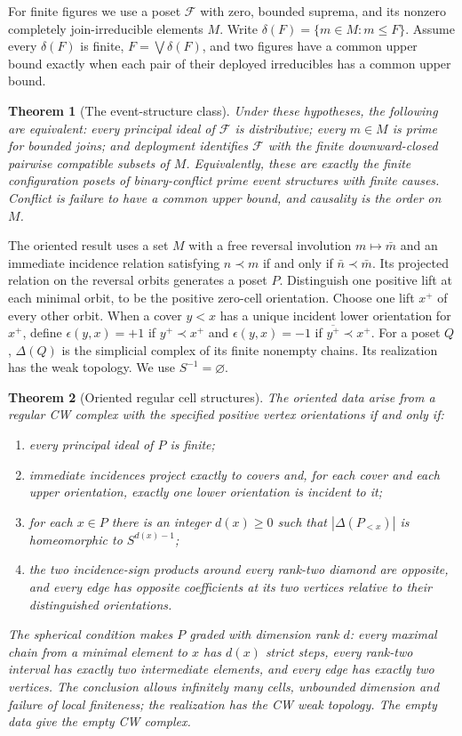 \documentclass[11pt,a4paper]{article}
\newtheorem{theorem}{Theorem}[section]
\theoremstyle{definition}
\begin{document}


For finite figures we use a poset $\mathcal F$ with zero, bounded suprema, and its nonzero completely join-irreducible elements $M$. Write $\delta(F)=\{m\in M:m\le F\}$. Assume every $\delta(F)$ is finite, $F=\bigvee\delta(F)$, and two figures have a common upper bound exactly when each pair of their deployed irreducibles has a common upper bound.

\begin{theorem}[The event-structure class]\label{thm:events}
Under these hypotheses, the following are equivalent: every principal ideal of $\mathcal F$ is distributive; every $m\in M$ is prime for bounded joins; and deployment identifies $\mathcal F$ with the finite downward-closed pairwise compatible subsets of $M$. Equivalently, these are exactly the finite configuration posets of binary-conflict prime event structures with finite causes. Conflict is failure to have a common upper bound, and causality is the order on $M$.
\end{theorem}

The oriented result uses a set $M$ with a free reversal involution
$m\mapsto\bar m$ and an immediate incidence relation satisfying
$n\prec m$ if and only if $\bar n\prec\bar m$. Its projected
relation on the reversal orbits generates a poset $P$. Distinguish
one positive lift at each minimal orbit, to be the positive
zero-cell orientation. Choose one lift $x^+$ of every other orbit.
When a cover $y<x$ has a unique incident lower orientation for
$x^+$, define $\epsilon(y,x)=+1$ if $y^+\prec x^+$ and
$\epsilon(y,x)=-1$ if $\overline{y^+}\prec x^+$.
For a poset $Q$, $\Delta(Q)$ is the simplicial complex of its
finite nonempty chains. Its realization has the weak topology.
We use $S^{-1}=\varnothing$.

\begin{theorem}[Oriented regular cell structures]\label{thm:cw}
The oriented data arise from a regular CW complex with the specified
positive vertex orientations if and only if:
\begin{enumerate}
\item every principal ideal of $P$ is finite;
\item immediate incidences project exactly to covers and, for each
cover and each upper orientation, exactly one lower orientation
is incident to it;
\item for each $x\in P$ there is an integer $d(x)\ge0$ such that
$|\Delta(P_{<x})|$ is homeomorphic to $S^{d(x)-1}$;
\item the two incidence-sign products around every rank-two
 diamond are opposite, and every edge has opposite coefficients
at its two vertices relative to their distinguished orientations.
\end{enumerate}
The spherical condition makes $P$ graded with dimension rank $d$:
every maximal chain from a minimal element to $x$ has $d(x)$
strict steps, every rank-two interval has exactly two intermediate
elements, and every edge has exactly two vertices.
The conclusion allows infinitely many cells, unbounded dimension
and failure of local finiteness; the realization has the CW weak
topology. The empty data give the empty CW complex.
\end{theorem}
\end{document}
